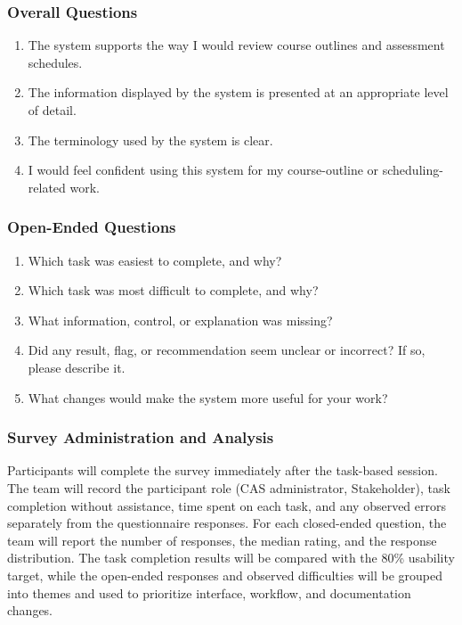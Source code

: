 \documentclass[12pt, titlepage]{article}
\begin{document}
\subsubsection*{Overall Questions}

\begin{enumerate}
    \item The system supports the way I would review course outlines and
    assessment schedules.
    \item The information displayed by the system is presented at an
    appropriate level of detail.
    \item The terminology used by the system is clear.
    \item I would feel confident using this system for my course-outline or
    scheduling-related work.
\end{enumerate}

\subsubsection*{Open-Ended Questions}

\begin{enumerate}
    \item Which task was easiest to complete, and why?
    \item Which task was most difficult to complete, and why?
    \item What information, control, or explanation was missing?
    \item Did any result, flag, or recommendation seem unclear or incorrect?
    If so, please describe it.
    \item What changes would make the system more useful for your work?
\end{enumerate}

\subsubsection*{Survey Administration and Analysis}

Participants will complete the survey immediately after the task-based
session. The team will record the participant role (CAS administrator, Stakeholder),
 task completion without assistance, time spent on each
task, and any observed errors separately from the questionnaire responses.
For each closed-ended question, the team will report the number
of responses, the median rating, and the response distribution. The task
completion results will be compared with the 80\% usability target, while the
open-ended responses and observed difficulties will be grouped into themes
and used to prioritize interface, workflow, and documentation changes.
\end{document}
